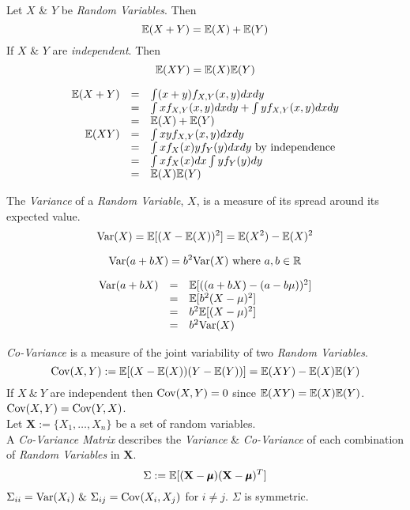 \documentclass[11pt,a4paper]{article}
\begin{document}
Let $X$ \& $Y$ be \textit{Random Variables}. Then
$$\mathbb{E}(X+Y)=\mathbb{E}(X)+\mathbb{E}(Y)$$
If $X$ \& $Y$ are \textit{independent}. Then
$$\mathbb{E}(XY)=\mathbb{E}(X)\mathbb{E}(Y)$$

\[\begin{array}{rcl}
\mathbb{E}(X+Y)&=&\int(x+y)f_{X,Y}(x,y)dxdy\\
&=&\int xf_{X,Y}(x,y)dxdy+\int yf_{X,Y}(x,y)dxdy\\
&=&\mathbb{E}(X)+\mathbb{E}(Y)\\
\mathbb{E}(XY)&=&\int xyf_{X,Y}(x,y)dxdy\\
&=&\int xf_X(x)yf_Y(y)dxdy\text{ by independence}\\
&=&\int xf_X(x)dx\int yf_Y(y)dy\\
&=&\mathbb{E}(X)\mathbb{E}(Y)
\end{array}\]

The \textit{Variance} of a \textit{Random Variable}, $X$, is a measure of its spread around its expected value.
$$\mathrm{Var}(X)=\mathbb{E}[(X-\mathbb{E}(X))^2]=\mathbb{E}(X^2)-\mathbb{E}(X)^2$$

$$\mathrm{Var}(a+bX)=b^2\mathrm{Var}(X)\text{ where }a,b\in\mathbb{R}$$

\[\begin{array}{rcl}
\mathrm{Var}(a+bX)&=&\mathbb{E}[((a+bX)-(a-b\mu))^2]\\
&=&\mathbb{E}[b^2(X-\mu)^2]\\
&=&b^2\mathbb{E}[(X-\mu)^2]\\
&=&b^2\mathrm{Var}(X)
\end{array}\]

\textit{Co-Variance} is a measure of the joint variability of two \textit{Random Variables}.
$$\mathrm{Cov}(X,Y):=\mathbb{E}[(X-\mathbb{E}(X))(Y-\mathbb{E}(Y))]=\mathbb{E}(XY)-\mathbb{E}(X)\mathbb{E}(Y)$$
\nb If $X\ \&\ Y$ are independent then $\mathrm{Cov}(X,Y)=0$ since $\mathbb{E}(XY)=\mathbb{E}(X)\mathbb{E}(Y)$.\\
\nb $\mathrm{Cov}(X,Y)=\mathrm{Cov}(Y,X)$.\\

Let $\textbf{X}:=\{X_1,\dots,X_n\}$ be a set of random variables.\\
A \textit{Co-Variance Matrix} describes the \textit{Variance} \& \textit{Co-Variance} of each combination of \textit{Random Variables} in $\textbf{X}$.\\
$$\Sigma:=\mathbb{E}[(\textbf{X}-\pmb\mu)(\textbf{X}-\pmb\mu)^T]$$
\nb $\Sigma_{ii}=\var(X_i)\ \&\ \Sigma_{ij}=\cov(X_i,X_j)$ for $i\neq j$. $\Sigma$ is symmetric.\\
\end{document}
